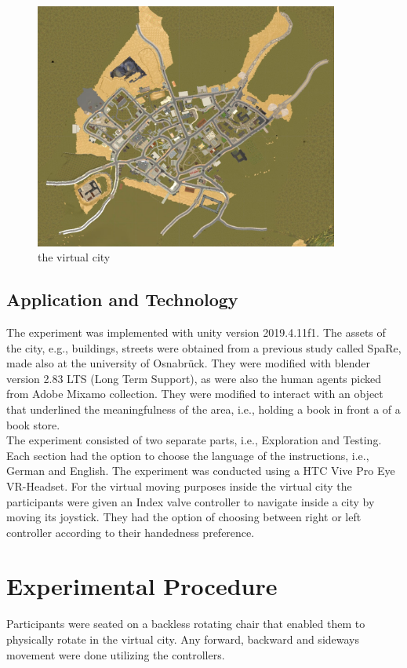 \begin{figure}[h]
	\centering
	\includegraphics[width=100mm]{figures/city.jpg}
	\caption[The virtual city]{the virtual city}
	\label{fig:city}
\end{figure}

\subsection{Application and Technology}

The experiment was implemented with unity version 2019.4.11f1. The assets of the city, e.g., buildings, streets were obtained from a previous study called SpaRe, made also at the university of Osnabrück. They were modified with blender version 2.83 LTS (Long Term Support), as were also the human agents picked from Adobe Mixamo collection. They were modified to interact with an object that underlined the meaningfulness of the area, i.e., holding a book in front a of a book store. \\
The experiment consisted of two separate parts, i.e., Exploration and Testing.  Each section had the option to choose the language of the instructions, i.e., German and English. The experiment was conducted using a HTC Vive Pro Eye VR-Headset. For the virtual moving purposes inside the virtual city the participants were given an Index valve controller to navigate inside a city by moving its joystick. They had the option of choosing between right or left controller according to their handedness preference.

\section{Experimental Procedure}

Participants were seated on a backless rotating chair that enabled them to physically rotate in the virtual city. Any forward, backward and sideways movement were done utilizing the controllers.

